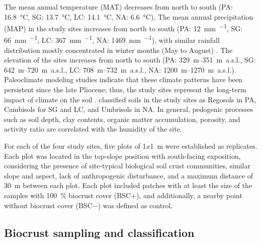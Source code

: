 The mean annual temperature (MAT) decreases from north to south (PA: \SI{16.8}{\degreeCelsius}, SG: \SI{13.7}{\degreeCelsius}, LC: \SI{14.1}{\degreeCelsius}, NA: \SI{6.6}{\degreeCelsius}). The mean annual precipitation (MAP) in the study sites increases from north to south (PA: \SI{12}{\milli\meter\per\year}, SG: \SI{66}{\milli\meter\per\year}, LC: \SI{367}{\milli\meter\per\year}, NA: \SI{1469}{\milli\meter\per\year}), with similar rainfall distribution mostly concentrated in winter months (May to August) \citep{Bernhard2018}. The elevation of the sites increases from north to south (PA: \SIrange{329}{351}{\meter}~a.s.l., SG: \SIrange{642}{720}{\meter}~a.s.l., LC: \SIrange{708}{732}{\meter}~a.s.l., NA: \SIrange{1200}{1270}{\meter}~a.s.l.). Paleoclimate modeling studies \citep{Mutz2018} indicate that these climate patterns have been persistent since the late Pliocene; thus, the study sites represent the long-term impact of climate on the soil \citep{Ewing2006}. \citet{Bernhard2018} classified soils in the study sites as Regosols in PA, Cambisols for SG and LC, and Umbrisols in NA. In general, pedogenic processes such as soil depth, clay contents, organic matter accumulation, porosity, and activity ratio are correlated with the humidity of the site.

For each of the four study sites, five plots of 1$x$\SI{1}{\meter} were established as replicates. Each plot was located in the top-slope position with south-facing exposition, considering the presence of site-typical biological soil crust communities, similar slope and aspect, lack of anthropogenic disturbance, and a maximum distance of \SI{30}{\meter} between each plot. Each plot included patches with at least the size of the samples with \SI{100}{\percent} biocrust cover (BSC+), and additionally, a nearby point without biocrust cover (BSC$-$) was defined as control.


\subsection{Biocrust sampling and classification}

